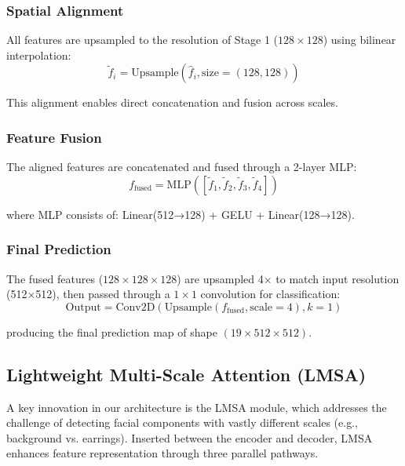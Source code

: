 \subsubsection{Spatial Alignment}

All features are upsampled to the resolution of Stage 1 ($128 \times 128$) using bilinear interpolation:
\begin{equation}
\tilde{f}_i = \text{Upsample}(\hat{f}_i, \text{size}=(128, 128))
\end{equation}

This alignment enables direct concatenation and fusion across scales.

\subsubsection{Feature Fusion}

The aligned features are concatenated and fused through a 2-layer MLP:
\begin{equation}
f_{\text{fused}} = \text{MLP}([\tilde{f}_1, \tilde{f}_2, \tilde{f}_3, \tilde{f}_4])
\end{equation}

where MLP consists of: Linear(512→128) + GELU + Linear(128→128).

\subsubsection{Final Prediction}

The fused features ($128 \times 128 \times 128$) are upsampled 4× to match input resolution (512×512), then passed through a $1\times1$ convolution for classification:
\begin{equation}
\text{Output} = \text{Conv2D}(\text{Upsample}(f_{\text{fused}}, \text{scale}=4), k=1)
\end{equation}

producing the final prediction map of shape $(19 \times 512 \times 512)$.

\subsection{Lightweight Multi-Scale Attention (LMSA)}

A key innovation in our architecture is the LMSA module, which addresses the challenge of detecting facial components with vastly different scales (e.g., background vs. earrings). Inserted between the encoder and decoder, LMSA enhances feature representation through three parallel pathways.

